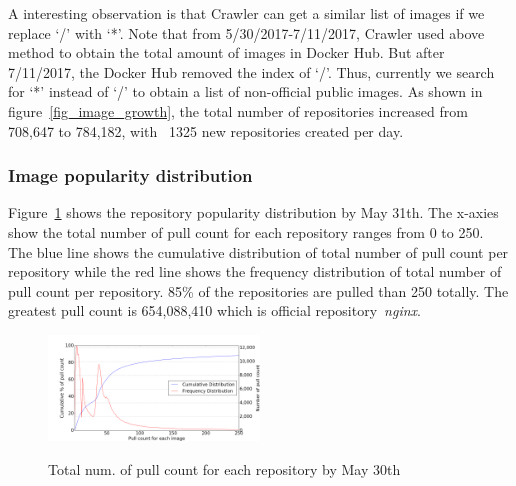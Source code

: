 
A interesting observation is that Crawler can get a similar list of images if we replace `/' with `*'. Note that from 5/30/2017-7/11/2017, Crawler used above method to obtain the total amount of images in Docker Hub. But after 7/11/2017, the Docker Hub removed the index of `/'. Thus, currently we search for `*' instead of `/' to obtain a list of non-official public images. As shown in figure~\ref{fig_image_growth}, the total number of repositories increased from 708,647 to 784,182, with ~1325 new repositories created per day.

\subsubsection{Image popularity distribution}


Figure~\ref{fig_pull_cnt_total} shows the repository popularity distribution by May 31th. The x-axies show the total number of pull count for each repository ranges from 0 to 250. The blue line shows the cumulative distribution of total number of pull count per repository while the red line shows the frequency distribution of total number of pull count per repository. 85\% of the repositories are pulled than 250 totally. The greatest pull count is 654,088,410 which is official repository~\textit{nginx}. 

\begin{figure}
	\centering
	\includegraphics[width=0.5\textwidth]{graphs/Pull_count_for_each_image.png}\\
	\caption{Total num. of pull count for each repository by May 30th}\label{fig_pull_cnt_total}
\end{figure}


